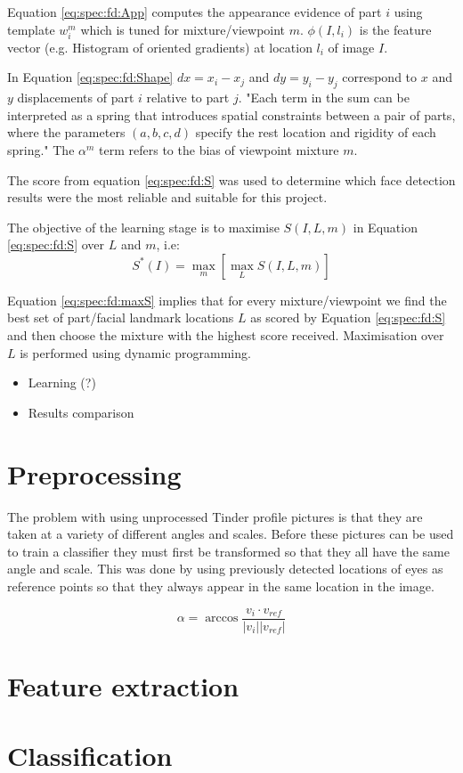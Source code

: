 Equation \ref{eq:spec:fd:App} computes the appearance evidence of part $i$
using template $w_i^m$ which is tuned for mixture/viewpoint $m$. $\phi(I,l_i)$
is the feature vector (e.g. Histogram of oriented gradients) at location $l_i$
of image $I$.

In Equation \ref{eq:spec:fd:Shape} $dx = x_i  - x_j$ and $dy = y_i - y_j$
correspond to $x$ and $y$ displacements of part $i$ relative to part $j$. "Each
term in the sum can be interpreted as a spring that introduces spatial
constraints between a pair of parts, where the parameters $(a,b,c,d)$ specify
the rest location and rigidity of each spring." \citep{zhu2012face}
The $\alpha^m$ term refers to the bias of viewpoint mixture $m$. 

The score from equation \ref{eq:spec:fd:S} was used to determine which face 
detection results were the most reliable and suitable for this project.

The objective of the learning stage is to maximise $S(I,L,m)$ in Equation
\ref{eq:spec:fd:S} over $L$ and $m$, i.e:
\begin{equation}
\label{eq:spec:fd:maxS}
S^*(I) = \max_m[\max_L S(I,L,m)]
\end{equation}

Equation \ref{eq:spec:fd:maxS} implies that for every mixture/viewpoint we find
the best set of part/facial landmark locations $L$ as scored by Equation
\ref{eq:spec:fd:S} and then choose the mixture with the highest score received.
Maximisation over $L$ is performed using dynamic programming.

\begin{itemize}
    \item Learning (?)
    \item Results comparison
\end{itemize}


\section{Preprocessing}
\label{spec:preproc}
The problem with using unprocessed Tinder profile pictures is that they are 
taken at a variety of different angles and scales. Before these pictures can 
be used to train a classifier they must first be transformed so that they all 
have the same angle and scale. This was done by using previously detected 
locations of eyes as reference points so that they always appear in the same 
location in the image. 

\begin{equation}
\label{eq:a}
\alpha = \arccos{\frac{v_{i} \cdot v_{ref}}{|v_{i}| |v_{ref}|}}
\end{equation}


 
\section{Feature extraction}


\section{Classification}

